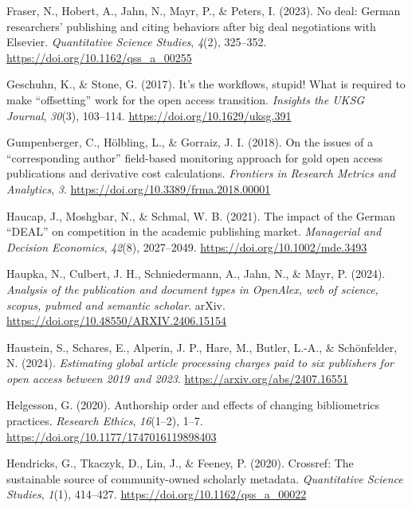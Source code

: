 \documentclass[a4paper,man,floatsintext,longtable,noextraspace,10pt]{apa6}
\newlength{\cslhangindent}
\newenvironment{CSLReferences}[2] %
{\begin{list}{}{%
  \setlength{\itemindent}{0pt}
  \setlength{\leftmargin}{0pt}
  \setlength{\parsep}{0pt}
  \ifodd #1
  \setlength{\leftmargin}{\cslhangindent}
  \setlength{\itemindent}{-1\cslhangindent}
  \fi
  \setlength{\itemsep}{#2\baselineskip}}}
{\end{list}}
\begin{document}
\begin{CSLReferences}{1}{0}
Fraser, N., Hobert, A., Jahn, N., Mayr, P., \& Peters, I. (2023). No
deal: German researchers' publishing and citing behaviors after big deal
negotiations with {Elsevier}. \emph{Quantitative Science Studies},
\emph{4}(2), 325--352. \url{https://doi.org/10.1162/qss_a_00255}

Geschuhn, K., \& Stone, G. (2017). It's the workflows, stupid! What is
required to make {``offsetting''} work for the open access transition.
\emph{Insights the {UKSG} Journal}, \emph{30}(3), 103--114.
\url{https://doi.org/10.1629/uksg.391}

Gumpenberger, C., Hölbling, L., \& Gorraiz, J. I. (2018). On the issues
of a {``corresponding author''} field-based monitoring approach for gold
open access publications and derivative cost calculations.
\emph{Frontiers in Research Metrics and Analytics}, \emph{3}.
\url{https://doi.org/10.3389/frma.2018.00001}

Haucap, J., Moshgbar, N., \& Schmal, W. B. (2021). The impact of the
{German {``DEAL''}} on competition in the academic publishing market.
\emph{Managerial and Decision Economics}, \emph{42}(8), 2027--2049.
\url{https://doi.org/10.1002/mde.3493}

Haupka, N., Culbert, J. H., Schniedermann, A., Jahn, N., \& Mayr, P.
(2024). \emph{Analysis of the publication and document types in
OpenAlex, web of science, scopus, pubmed and semantic scholar}. arXiv.
\url{https://doi.org/10.48550/ARXIV.2406.15154}

Haustein, S., Schares, E., Alperin, J. P., Hare, M., Butler, L.-A., \&
Schönfelder, N. (2024). \emph{Estimating global article processing
charges paid to six publishers for open access between 2019 and 2023}.
\url{https://arxiv.org/abs/2407.16551}

Helgesson, G. (2020). Authorship order and effects of changing
bibliometrics practices. \emph{Research Ethics}, \emph{16}(1--2), 1--7.
\url{https://doi.org/10.1177/1747016119898403}

Hendricks, G., Tkaczyk, D., Lin, J., \& Feeney, P. (2020). Crossref: The
sustainable source of community-owned scholarly metadata.
\emph{Quantitative Science Studies}, \emph{1}(1), 414--427.
\url{https://doi.org/10.1162/qss_a_00022}


\end{CSLReferences}
\end{document}
